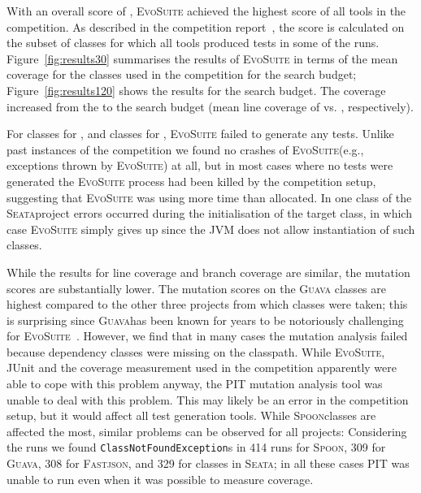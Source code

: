 \documentclass[sigconf]{acmart}
\newcommand{\project}[1]{\textsc{#1}}
\newcommand{\Spoon}{\project{Spoon}}
\newcommand{\Guava}{\project{Guava}}
\newcommand{\Fastjson}{\project{Fastjson}}
\newcommand{\Seata}{\project{Seata}}
\newcommand{\EVOSUITE}{\textsc{EvoSuite}\xspace}
\begin{document}
With an overall score of \score, \EVOSUITE achieved the highest score of all
tools in the competition. As described in the competition
report~\cite{SBST-toolcomp22}, the score is calculated on the subset of \cuts classes
for which all tools produced tests in some of the runs.
Figure~\ref{fig:results30} summarises the results of \EVOSUITE in terms of the
mean coverage for the \cuts classes used in the competition for the \budgetShort search budget; Figure~\ref{fig:results120} shows the results for the \budgetLong search budget. The coverage
increased from the \budgetShort to the \budgetLong search budget (mean line
coverage of \avgLinesCoverageRatioShort vs. \avgLinesCoverageRatioLong, respectively). 

For \numTestGenFailedShort classes for \budgetShort, and \numTestGenFailedLong
classes for \budgetLong, \EVOSUITE failed to generate any tests. Unlike past
instances of the competition we found no crashes of \EVOSUITE (e.g., exceptions
thrown by \EVOSUITE) at all, but in most cases where no tests were generated
the \EVOSUITE process had been killed by the competition setup, suggesting that
\EVOSUITE was using more time than allocated. In one class of the \Seata project
errors occurred during the initialisation of the target class, in which case
\EVOSUITE simply gives up since the JVM does not allow instantiation of such
classes.



While the results for line coverage and branch coverage are similar, the
mutation scores are substantially lower. The mutation scores on the \Guava
classes are highest compared to the other three projects from which classes
were taken; this is surprising since \Guava has been known for years to be
notoriously challenging for
\EVOSUITE~\cite{campos2015continuous,almulla2017using}. However, we find that
in many cases the mutation analysis failed because dependency classes were
missing on the classpath. While \EVOSUITE, JUnit and the coverage measurement
used in the competition apparently were able to cope with this problem anyway,
the PIT mutation analysis tool was unable to deal with this problem. This may
likely be an error in the competition setup, but it would affect all test
generation tools. While \Spoon classes are affected the most, similar problems
can be observed for all projects: Considering the \budgetLong runs we found
\texttt{ClassNotFoundException}s in 414 runs for \Spoon, 309 for \Guava, 308 for
\Fastjson, and 329 for classes in \Seata; in all these cases PIT was unable to
run even when it was possible to measure coverage.
\end{document}
